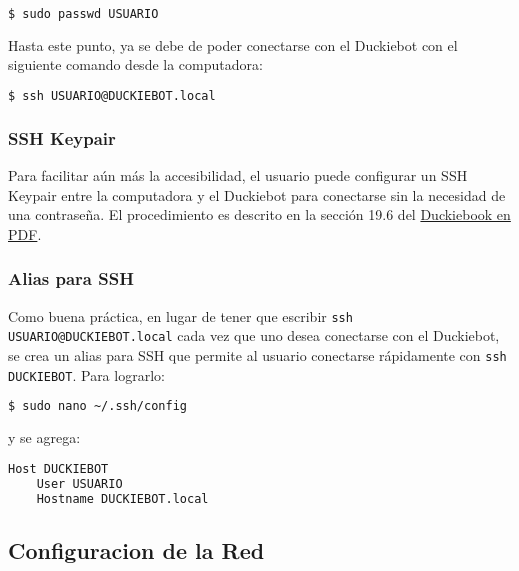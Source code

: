 \documentclass[12pt]{article}
\begin{document}
\begin{lstlisting}[language=bash]
  $ sudo passwd USUARIO
\end{lstlisting}

Hasta este punto, ya se debe de poder conectarse con el Duckiebot con el siguiente comando desde la computadora:

\begin{lstlisting}[language=bash]
  $ ssh USUARIO@DUCKIEBOT.local
\end{lstlisting}

\subsubsection{SSH Keypair}

Para facilitar aún más la accesibilidad, el usuario puede configurar un SSH Keypair entre la computadora y el Duckiebot para conectarse sin la necesidad de una contraseña. El procedimiento es descrito en la sección 19.6 del \href{https://http://book.duckietown.org/master/duckiebook.pdf}{Duckiebook en PDF}.

\subsubsection{Alias para SSH}

Como buena práctica, en lugar de tener que escribir \texttt{ssh USUARIO@DUCKIEBOT.local} cada vez que uno desea conectarse con el Duckiebot, se crea un alias para SSH que permite al usuario conectarse rápidamente con \texttt{ssh DUCKIEBOT}. Para lograrlo:


\begin{lstlisting}[language=bash]
  $ sudo nano ~/.ssh/config
\end{lstlisting}

y se agrega:


\begin{lstlisting}[language=bash]
  Host DUCKIEBOT
  	User USUARIO
  	Hostname DUCKIEBOT.local
\end{lstlisting}



\subsection{Configuracion de la Red}
\end{document}

